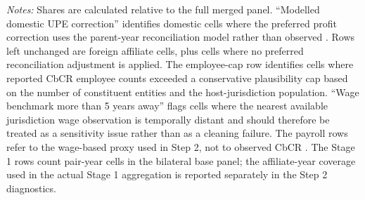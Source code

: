 \begin{table}[H]
\vspace{0.5em}
\begin{minipage}{0.93\textwidth}
\footnotesize \textit{Notes:} Shares are calculated relative to the full merged panel. ``Modelled domestic UPE correction'' identifies domestic cells where the preferred profit correction uses the parent-year reconciliation model rather than observed . Rows left unchanged are foreign affiliate cells, plus cells where no preferred reconciliation adjustment is applied. The employee-cap row identifies cells where reported CbCR employee counts exceeded a conservative plausibility cap based on the number of constituent entities and the host-jurisdiction population. ``Wage benchmark more than 5 years away'' flags cells where the nearest available jurisdiction wage observation is temporally distant and should therefore be treated as a sensitivity issue rather than as a cleaning failure. The payroll rows refer to the wage-based proxy used in Step 2, not to observed CbCR . The Stage 1 rows count pair-year cells in the bilateral base panel; the affiliate-year coverage used in the actual Stage 1 aggregation is reported separately in the Step 2 diagnostics.
\end{minipage}
\end{table}

